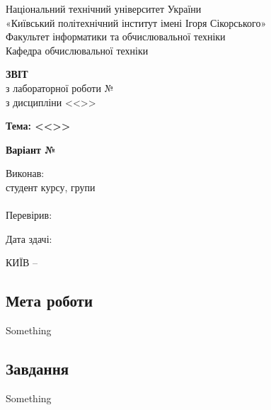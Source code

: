 \documentclass[14pt, a4paper]{extreport}
\begin{document}
	
	\begin{titlepage}
		\begin{center}
			\normalsize
			Національний технічний університет України\\
			«Київський політехнічний інститут імені Ігоря Сікорського» \\[0.5em]
			Факультет інформатики та обчислювальної техніки\\
			Кафедра обчислювальної техніки
			
			\vfill
			
			{\large \textbf{ЗВІТ}\\[0.5em]}
			{з лабораторної роботи №\LabNumber \\}
			{з дисципліни <<\CourseTitle>>}
			
			\vspace{2em}
			
			{\textbf{Тема: <<\Topic>>}}
			
			\vspace{1em}
			
			{\textbf{Варіант №\Variant}}
			
			\vfill
			
			\begin{flushright}
				Виконав: \\ студент \CourseNumber{} курсу, групи \StudentGroup \\
				\StudentName \\[1em]
				Перевірив: \\ \Teacher
			\end{flushright}
			
			\vfill
			
			\begin{flushright}
				Дата здачі: \DTMtoday
			\end{flushright}
			
			\vspace{5em}
			КИЇВ -- \ReportYear
		\end{center}
	\end{titlepage}
	
	\clearpage
	\setcounter{page}{2}
	
	\subsection*{Мета роботи} 
	Something
	
	\subsection*{Завдання}
	Something
	
\end{document}
